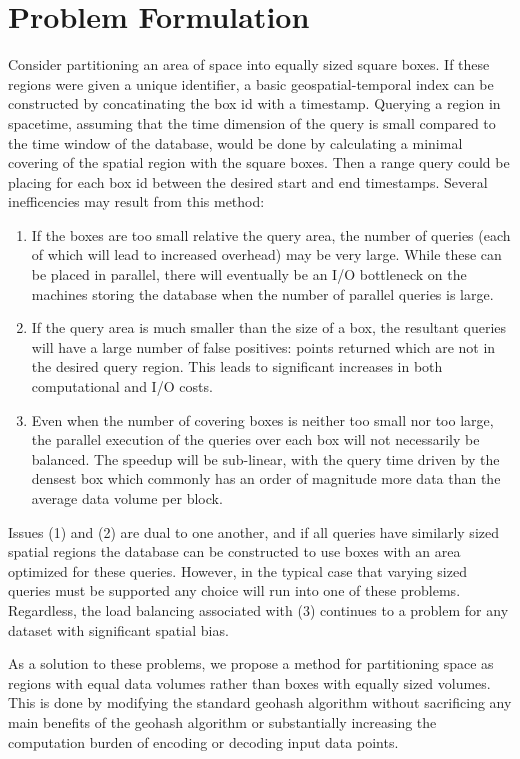 \documentclass[nips13submit_09,times,art10]{article} %
\begin{document}
\section{Problem Formulation} \label{sec:form}

Consider partitioning an area of space into equally sized square boxes. If these
regions were given a unique identifier, a basic geospatial-temporal index can be constructed
by concatinating the box id with a timestamp. Querying a region in spacetime, assuming
that the time dimension of the query is small compared to the time window of the database,
would be done by calculating a minimal covering of the spatial region with the square boxes.
Then a range query could be placing for each box id between the desired start and end timestamps.
Several inefficencies may result from this method:
\begin{enumerate}
\item If the boxes are too small relative the query area, the number of queries (each
of which will lead to increased overhead) may be very large. While these can be placed
in parallel, there will eventually be an I/O bottleneck on the machines storing
the database when the number of parallel queries is large.
\item If the query area is much smaller than the size of a box, the resultant queries
will have a large number of false positives: points returned which are not in the
desired query region. This leads to significant increases in both computational and I/O costs.
\item Even when the number of covering boxes is neither too small nor too large, the parallel
execution of the queries over each box will not necessarily be balanced. The speedup will be
sub-linear, with the query time driven by the densest box which commonly has an order of
magnitude more data than the average data volume per block.
\end{enumerate}
Issues (1) and (2) are dual to one another, and if all queries have similarly sized
spatial regions the database can be constructed to use boxes with an area optimized
for these queries. However, in the typical case that varying sized queries must be
supported any choice will run into one of these problems. Regardless, the load
balancing associated with (3) continues to a problem for any dataset with significant
spatial bias.

As a solution to these problems, we propose a method for partitioning space as regions
with equal data volumes rather than boxes with equally sized volumes. This is done by
modifying the standard geohash algorithm without sacrificing any main benefits of the
geohash algorithm or substantially increasing the computation burden of encoding or
decoding input data points.
\end{document}
